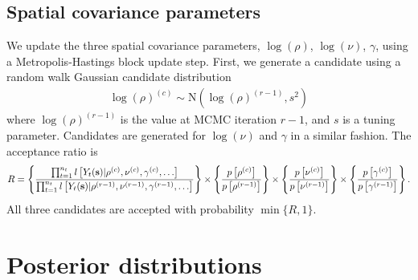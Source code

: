 \subsection*{Spatial covariance parameters}
We update the three spatial covariance parameters, $\log(\rho)$, $\log(\nu)$, $\gamma$, using a Metropolis-Hastings block update step.
First, we generate a candidate using a random walk Gaussian candidate distribution
\begin{align*}
  \log(\rho)^{(c)} \sim \text{N}\left(\log(\rho)^{(r - 1)}, s^2\right)
\end{align*}
where $\log(\rho)^{(r-1)}$ is the value at MCMC iteration $r - 1$, and $s$ is a tuning parameter.
Candidates are generated for $\log(\nu)$ and $\gamma$ in a similar fashion.
The acceptance ratio is
\begin{align*}
  R = \left\{ \frac{ \prod_{t = 1}^{n_t} l \left[Y_t(\mathbf{s}) | \rho^{(c)}, \nu^{(c)}, \gamma^{(c)}, \ldots \right] }{\prod_{t = 1}^{n_t} l \left[Y_t(\mathbf{s}) | \rho^{(r-1)}, \nu^{(r-1)}, \gamma^{(r-1)}, \ldots \right] } \right\} \times \left\{ \frac{ p \left[\rho^{(c)} \right] }{ p \left[\rho^{(r - 1)}\right] } \right\} \times \left\{ \frac{ p \left[\nu^{(c)} \right] }{ p \left[\nu^{(r - 1)} \right] } \right\} \times \left\{ \frac{ p \left[ \gamma^{(c)} \right] }{ p \left[\gamma^{(r - 1)} \right] } \right\}.
\end{align*}
All three candidates are accepted with probability $\min\{R, 1\}$.

\section{Posterior distributions} \label{sta:posterior}

